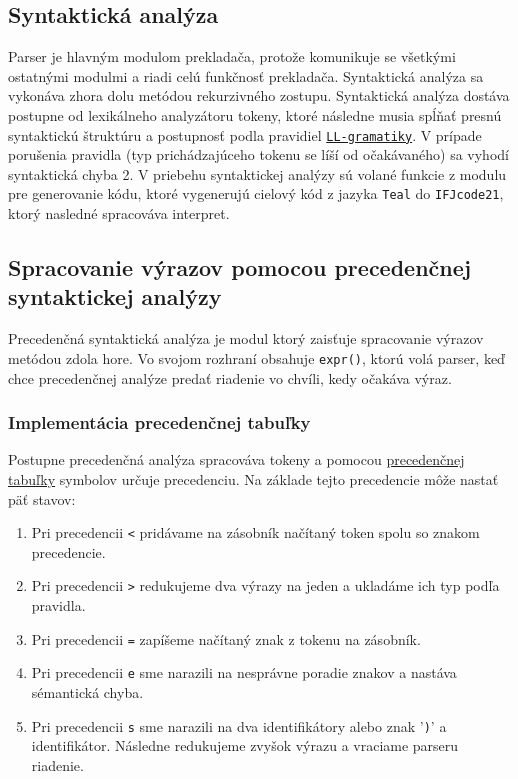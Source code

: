 \documentclass[a4paper, 11pt]{article}
\begin{document}
    \subsection{Syntaktická analýza}
    Parser je hlavným modulom prekladača, protože komunikuje se všetkými ostatnými modulmi a riadi celú funkčnosť
    prekladača. Syntaktická analýza sa vykonáva zhora dolu metódou rekurzivného zostupu.
    Syntaktická analýza dostáva postupne od lexikálneho analyzátoru tokeny, ktoré následne musia spĺňať presnú
    syntaktickú štruktúru a postupnosť podla pravidiel \hyperref[sec: LL-gramatika]{\texttt{LL-gramatiky}}.
    V prípade porušenia pravidla (typ prichádzajúceho tokenu se líší od očakávaného) sa vyhodí syntaktická chyba 2.
    V priebehu syntaktickej analýzy sú volané funkcie z modulu pre generovanie kódu, ktoré vygenerujú cielový kód z
    jazyka \texttt{Teal} do \texttt{IFJcode21}, ktorý nasledné spracováva interpret.


    \subsection{Spracovanie výrazov pomocou precedenčnej syntaktickej analýzy}
    Precedenčná syntaktická analýza je modul ktorý zaisťuje spracovanie výrazov metódou zdola hore.
    Vo svojom rozhraní obsahuje \texttt{expr()}, ktorú volá parser, keď chce precedenčnej analýze predať
    riadenie vo chvíli, kedy očakáva výraz.
    \subsubsection{Implementácia precedenčnej tabuľky}
    Postupne precedenčná analýza spracováva tokeny a pomocou \hyperref[sec: prec-tabulka]{precedenčnej tabuľky} symbolov
    určuje precedenciu. Na základe tejto precedencie môže nastať päť stavov:
    \begin{enumerate}
        \item Pri precedencii \texttt{<} pridávame na zásobník načítaný token spolu so znakom precedencie.
        \item Pri precedencii \texttt{>} redukujeme dva výrazy na jeden a ukladáme ich typ podľa pravidla.
        \item Pri precedencii \texttt{=} zapíšeme načítaný znak z tokenu na zásobník.
        \item Pri precedencii \texttt{e} sme narazili na nesprávne poradie znakov a nastáva sémantická chyba.
        \item Pri precedencii \texttt{s} sme narazili na dva identifikátory alebo znak '\texttt{)}' a identifikátor. Následne redukujeme zvyšok výrazu a vraciame parseru riadenie.
    \end{enumerate}
\end{document}
